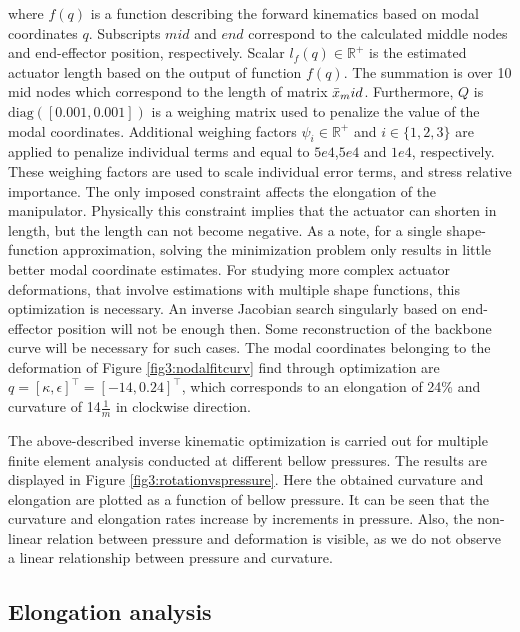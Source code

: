 where $f(q)$ is a function describing the forward kinematics based on modal coordinates $q$. Subscripts $mid$ and $end$ correspond to the calculated middle nodes and end-effector position, respectively. Scalar $l_f(q) \in \mathbb{R}^+$ is the estimated actuator length based on the output of function $f(q)$. The summation is over 10 mid nodes which correspond to the length of matrix $\Bar{x}_mid$. Furthermore, $Q$ is $\text{diag}([0.001,0.001])$ is a weighing matrix used to penalize the value of the modal coordinates. Additional weighing factors $\psi_i \in \mathbb{R}^+$ and $i \in \{1,2,3\}$ are applied to penalize individual terms and equal to $5e4$,$5e4$ and $1e4$, respectively. These weighing factors are used to scale individual error terms, and stress relative importance. The only imposed constraint affects the elongation of the manipulator. Physically this constraint implies that the actuator can shorten in length, but the length can not become negative. As a note, for a single shape-function approximation, solving the minimization problem only results in little better modal coordinate estimates. For studying more complex actuator deformations, that involve estimations with multiple shape functions, this optimization is necessary. An inverse Jacobian search singularly based on end-effector position will not be enough then. Some reconstruction of the backbone curve will be necessary for such cases. The modal coordinates belonging to the deformation of Figure \ref{fig3:nodalfitcurv} find through optimization are $q = [\kappa,\epsilon]^\top = [-14,0.24]^\top$, which corresponds to an elongation of 24\% and curvature of 14$\frac{1}{m}$ in clockwise direction.


The above-described inverse kinematic optimization is carried out for multiple finite element analysis conducted at different bellow pressures. The results are displayed in Figure \ref{fig3:rotationvspressure}. Here the obtained curvature and elongation are plotted as a function of bellow pressure. It can be seen that the curvature and elongation rates increase by increments in pressure. Also, the non-linear relation between pressure and deformation is visible, as we do not observe a linear relationship between pressure and curvature. 




\subsection{Elongation analysis}
\label{subsecelong}

